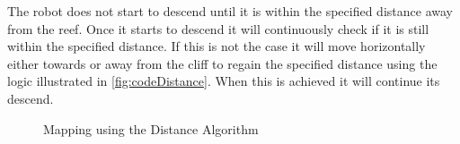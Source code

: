 \documentclass[twoside, 12pt]{article}
\begin{document}
\begin{figure}
\vspace{-50pt}
\end{figure}

The robot does not start to descend until it is within the specified distance away from the reef. Once it starts to descend it will continuously check if it is still within the specified distance. If this is not the case it will move horizontally either towards or away from the cliff to regain the specified distance using the logic illustrated in \autoref{fig:codeDistance}. When this is achieved it will continue its descend.\\

\begin{figure}
\vspace{0pt}
  \begin{center}
  \end{center}
\vspace{-20pt}
  \caption{Mapping using the Distance Algorithm}
  \label{fig:firstMapping}
\vspace{20pt}
\end{figure}
\end{document}
